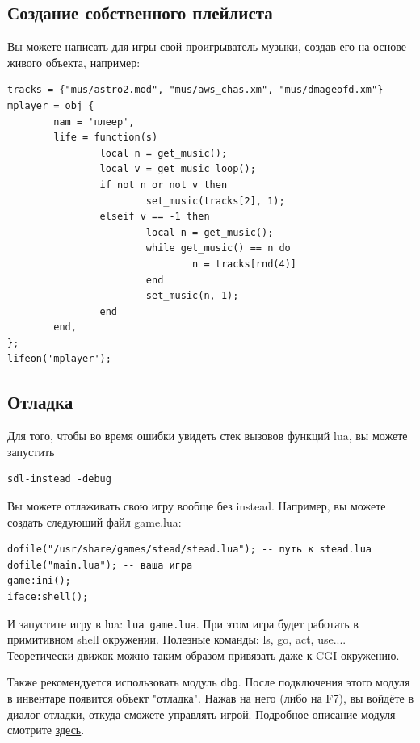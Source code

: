 \documentclass[12pt]{article}
\begin{document}
\subsection{Создание собственного плейлиста}
Вы можете написать для игры свой проигрыватель музыки, создав его на основе живого объекта, например:

\begin{verbatim}
tracks = {"mus/astro2.mod", "mus/aws_chas.xm", "mus/dmageofd.xm"}
mplayer = obj {
        nam = 'плеер',
        life = function(s)
                local n = get_music();
                local v = get_music_loop();
                if not n or not v then
                        set_music(tracks[2], 1);
                elseif v == -1 then
                        local n = get_music();
                        while get_music() == n do
                                n = tracks[rnd(4)]
                        end
                        set_music(n, 1);
                end
        end,
};
lifeon('mplayer');
\end{verbatim}

\subsection{Отладка}
Для того, чтобы во время ошибки увидеть стек вызовов функций lua, вы можете запустить

\begin{verbatim}
sdl-instead -debug
\end{verbatim}

Вы можете отлаживать свою игру вообще без instead. Например, вы можете создать следующий файл game.lua:

\begin{verbatim}
dofile("/usr/share/games/stead/stead.lua"); -- путь к stead.lua
dofile("main.lua"); -- ваша игра
game:ini();
iface:shell();
\end{verbatim}

И запустите игру в lua: \verb/lua game.lua/. При этом игра будет работать в примитивном shell окружении. Полезные команды: ls, go, act, use.... Теоретически движок можно таким образом привязать даже к CGI окружению.

Также рекомендуется использовать модуль \verb/dbg/. После подключения этого модуля в инвентаре появится объект "отладка". Нажав на него (либо на F7), вы войдёте в диалог отладки, откуда сможете управлять игрой. Подробное описание модуля смотрите \href{http://instead.syscall.ru/wiki/ru/gamedev/modules/dbg}{здесь}.
\end{document}
